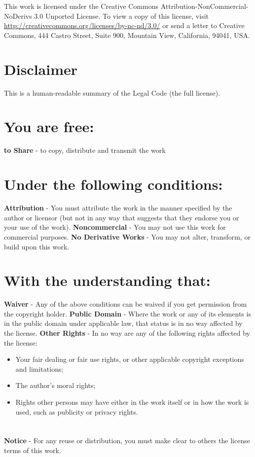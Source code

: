 \clearpage
\thispagestyle{empty}
\setcounter{secnumdepth}{0}
\label{sec:appendixLbrief}
\\ \\
This work is licensed under the Creative Commons
Attribution-NonCommercial-NoDerivs 3.0 Unported License. To view a copy of this
license, visit \url{http://creativecommons.org/licenses/by-nc-nd/3.0/} or send a
letter to Creative Commons, 444 Castro Street, Suite 900, Mountain View,
California, 94041, USA.

\section{Disclaimer}
This is a human-readable summary of the Legal Code (the full license).
\section{You are free:}
    \textbf{to Share} - to copy, distribute and transmit the work
\section{Under the following conditions:}
    \textbf{Attribution} - You must attribute the work in the manner specified
    by the author or licensor (but not in any way that suggests that they
    endorse you or your use of the work).
    \textbf{Noncommercial} - You may not use this work for commercial purposes.
    \textbf{No Derivative Works} - You may not alter, transform, or build upon
    this work.
\section{With the understanding that:}
    \textbf{Waiver} - Any of the above conditions can be waived if you get
    permission from the copyright holder.
    \textbf{Public Domain} - Where the work or any of its elements is in the
    public domain under applicable law, that status is in no way affected by the
    license.
    \textbf{Other Rights} - In no way are any of the following rights affected
    by the license:
      \begin{itemize} 
        \item {Your fair dealing or fair use rights, or other applicable
      copyright exceptions and limitations;} 
        \item {The author's moral rights;} 
        \item {Rights other persons may have either in the work itself or in how
      the work is used, such as publicity or privacy rights.}
      \end{itemize}
\section{}
\textbf{Notice} - For any reuse or distribution, you must make clear to
    others the license terms of this work.


